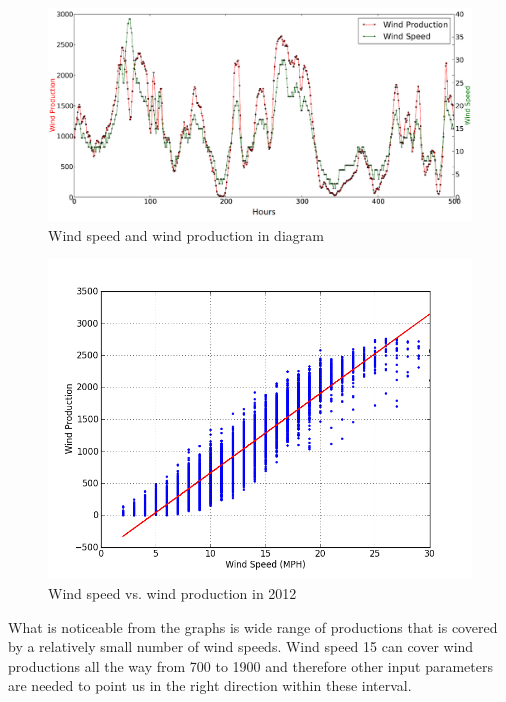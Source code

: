 \begin{figure}[H]
\centering
\includegraphics[width=0.99\linewidth,natwidth=898,natheight=587]{billeder/windSpeedWindProductionPlot.png}
\caption{Wind speed and wind production in diagram}
\label{fig:windSpeedWindProductionPlot}
\end{figure}

\begin{figure}[H]
\centering
\includegraphics[width=0.99\linewidth,natwidth=898,natheight=587]{billeder/WindSpeedVsProduction.png}
\caption{Wind speed vs. wind production in 2012}
\label{fig:windVsProd}
\end{figure}

What is noticeable from the graphs is wide range of productions that is covered by a relatively small number of wind speeds. Wind speed 15 can cover wind productions all the way from 700 to 1900 and therefore other input parameters are needed to point us in the right direction within these interval. 





